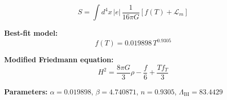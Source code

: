 
\begin{equation}
  S = \int d^4x \, |e| \, \frac{1}{16\pi G} \left[ f(T) + \mathcal{L}_m \right]
\end{equation}

\textbf{Best-fit model:}
\begin{equation}
  f(T) = 0.019898 \, T^{0.9305}
\end{equation}

\textbf{Modified Friedmann equation:}
\begin{equation}
  H^2 = \frac{8\pi G}{3} \rho - \frac{f}{6} + \frac{T f_T}{3}
\end{equation}

\textbf{Parameters:}
$\alpha = 0.019898$, \quad
$\beta = 4.740871$, \quad
$n = 0.9305$, \quad
$\Lambda_{\text{BI}} = 83.4429$